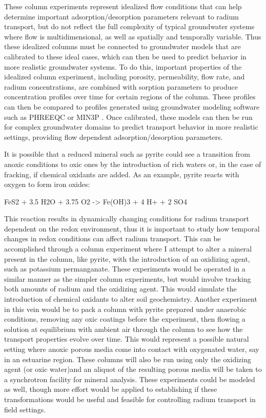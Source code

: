 \documentclass[twoside,12pt,titlepage]{article}
\begin{document}
\par These column experiments represent idealized flow conditions that can help determine important adsorption/desorption parameters relevant to radium transport, but do not reflect the full complexity of typical groundwater systems where flow is multidimensional, as well as spatially and temporally variable. Thus these idealized columns must be connected to groundwater models that are calibrated to these ideal cases, which can then be used to predict behavior in more realistic groundwater systems. To do this, important properties of the idealized column experiment, including porosity, permeability, flow rate, and radium concentrations, are combined with sorption parameters to produce concentration profiles over time for certain regions of the column. These profiles can then be compared to profiles generated using groundwater modeling software such as PHREEQC \cite{PHREEQC} or MIN3P \cite{MIN3P}. Once calibrated, these models can then be run for complex groundwater domains to predict transport behavior in more realistic settings, providing flow dependent adsorption/desorption parameters.
\par It is possible that a reduced mineral such as pyrite could see a transition from anoxic conditions to oxic ones by the introduction of  rich waters or, in the case of fracking, if chemical oxidants are added. As an example, pyrite reacts with oxygen to form iron oxides:

\begin{reaction*}
FeS2{\sld} + 3.5 H2O{\lqd} + 3.75 O2{\gas} -> Fe(OH)3{\sld} + 4 H+ + 2 SO4\mch[2]
\end{reaction*}

This reaction results in dynamically changing conditions for radium transport dependent on the redox environment, thus it is important to study how temporal changes in redox conditions can affect radium transport. This can be accomplished through a column experiment where I attempt to alter a mineral present in the column, like pyrite, with the introduction of an oxidizing agent, such as potassium permanganate. These experiments would be operated in a similar manner as the simpler column experiments, but would involve tracking both amounts of radium and the oxidizing agent. This would simulate the introduction of chemical oxidants to alter soil geochemistry. Another experiment in this vein would be to pack a column with pyrite prepared under anaerobic conditions, removing any oxic coatings before the experiment, then flowing a solution at equilibrium with ambient air through the column to see how the transport properties evolve over time. This would represent a possible natural setting where anoxic porous media come into contact with oxygenated water, say in an estuarine region. These columns will also be run using only the oxidizing agent (or oxic water)and an aliquot of the resulting porous media will be taken to a synchrotron facility for mineral analysis. These experiments could be modeled as well, though more effort would be applied to establishing if these transformations would be useful and feasible for controlling radium transport in field settings.
\end{document}
